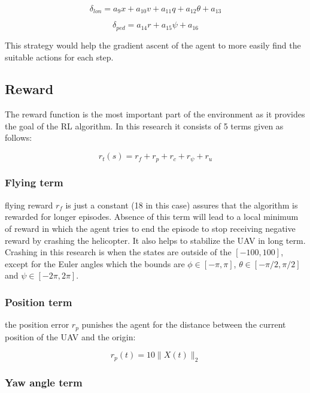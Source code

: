 \begin{equation}
	\delta_{lon} = a_9 x + a_{10} v + a_{11} q + a_{12} \theta + a_{13}
\end{equation}

\begin{equation}
	\delta_{ped} = a_{14} r + a_{15} \psi + a_{16}
\end{equation}

This strategy would help the gradient ascent of the agent to more easily find the suitable actions for each step. 

\subsection{Reward}

The reward function is the most important part of the environment as it provides the goal of the RL algorithm. In this research it consists of 5 terms given as follows:

\begin{equation}
	r_t(s) = r_{f} + r_{p} + r_{c} + r_{\psi} + r_u
\end{equation}

\subsubsection{Flying term}

flying reward $r_{f}$ is just a constant (18 in this case) assures that the algorithm is rewarded for longer episodes. Absence of this term will lead to a local minimum of reward in which the agent tries to end the episode to stop receiving negative reward by crashing the helicopter. It also helps to stabilize the UAV in long term. Crashing in this research is when the states are outside of the $[-100,100]$, except for the Euler angles which the bounds are $ \phi \in [-\pi,\pi]$, $ \theta \in [-\pi/2,\pi/2]$ and $ \psi \in [-2\pi,2\pi]$.

\subsubsection{Position term}

the position error $r_{p}$ punishes the agent for the distance between the current position of the UAV and the origin:

\begin{equation}
	r_{p}(t) = 10 \| X(t) \|_2
\end{equation}

\subsubsection{Yaw angle term}

